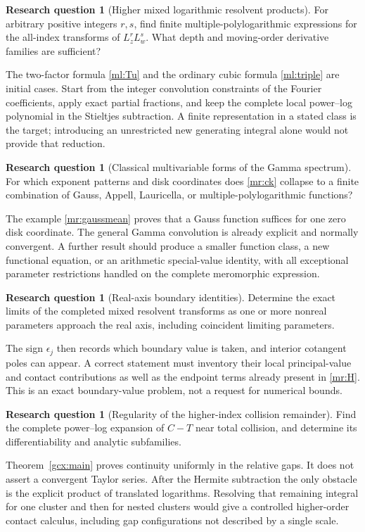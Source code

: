 \documentclass[11pt]{article}
\numberwithin{equation}{section}
\theoremstyle{plain}
\theoremstyle{definition}
\newtheorem{question}[theorem]{Research question}
\theoremstyle{remark}
\begin{document}
\begin{question}[Higher mixed logarithmic resolvent products]
For arbitrary positive integers $r,s$, find finite multiple-polylogarithmic
expressions for the all-index transforms of $L_z^rL_w^s$.
What depth and moving-order derivative families are sufficient?
\end{question}
The two-factor formula \eqref{ml:Tu} and the ordinary cubic formula
\eqref{ml:triple} are initial cases. Start from the integer convolution
constraints of the Fourier coefficients, apply exact partial fractions,
and keep the complete local power--log polynomial in the Stieltjes
subtraction. A finite representation in a stated class is the target;
introducing an unrestricted new generating integral alone would not
provide that reduction.

\begin{question}[Classical multivariable forms of the Gamma spectrum]
For which exponent patterns and disk coordinates does
\eqref{mr:ck} collapse to a finite combination of Gauss, Appell,
Lauricella, or multiple-polylogarithmic functions?
\end{question}
The example \eqref{mr:gaussmean} proves that a Gauss function suffices
for one zero disk coordinate. The general Gamma convolution is already
explicit and normally convergent. A further result should produce a
smaller function class, a new functional equation, or an arithmetic
special-value identity, with all exceptional parameter restrictions
handled on the complete meromorphic expression.

\begin{question}[Real-axis boundary identities]
Determine the exact limits of the completed mixed resolvent transforms
as one or more nonreal parameters approach the real axis, including
coincident limiting parameters.
\end{question}
The sign $\epsilon_j$ then records which boundary value is taken, and
interior cotangent poles can appear. A correct statement must inventory
their local principal-value and contact contributions as well as the
endpoint terms already present in \eqref{mr:H}. This is an exact
boundary-value problem, not a request for numerical bounds.

\begin{question}[Regularity of the higher-index collision remainder]
Find the complete power--log expansion of $C-T$ near total collision,
and determine its differentiability and analytic subfamilies.
\end{question}
Theorem~\ref{gcx:main} proves continuity uniformly in the relative
gaps. It does not assert a convergent Taylor series. After the Hermite
subtraction the only obstacle is the explicit product of translated
logarithms. Resolving that remaining integral for one cluster and then
for nested clusters would give a controlled higher-order contact
calculus, including gap configurations not described by a single scale.
\end{document}
